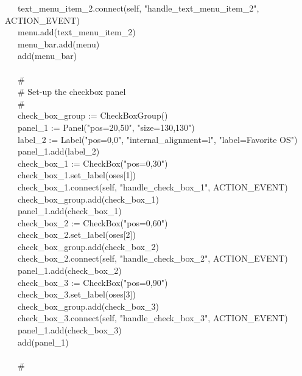 {\>   \ \ \ text\_menu\_item\_2.connect(self,
"handle\_text\_menu\_item\_2",\\
\>\>\>\>\>ACTION\_EVENT) \\
\>   \ \ \ menu.add(text\_menu\_item\_2) \\
\>   \ \ \ menu\_bar.add(menu) \\
\>   \ \ \ add(menu\_bar) \\
\ \\
\>   \ \ \ \# \\
\>   \ \ \ \# Set-up the checkbox panel \\
\>   \ \ \ \# \\
\>   \ \ \ check\_box\_group := CheckBoxGroup() \\
\>   \ \ \ panel\_1 := Panel("pos=20,50",
"size=130,130") \\
\>   \ \ \ label\_2 := Label("pos=0,0",
"internal\_alignment=l",
"label=Favorite OS") \\
\>   \ \ \ panel\_1.add(label\_2) \\
\>   \ \ \ check\_box\_1 :=
CheckBox("pos=0,30") \\
\>   \ \ \ check\_box\_1.set\_label(oses[1]) \\
\>   \ \ \ check\_box\_1.connect(self,
"handle\_check\_box\_1", ACTION\_EVENT) \\
\>   \ \ \ check\_box\_group.add(check\_box\_1) \\
\>   \ \ \ panel\_1.add(check\_box\_1) \\
\>   \ \ \ check\_box\_2 :=
CheckBox("pos=0,60") \\
\>   \ \ \ check\_box\_2.set\_label(oses[2]) \\
\>   \ \ \ check\_box\_group.add(check\_box\_2) \\
\>   \ \ \ check\_box\_2.connect(self,
"handle\_check\_box\_2", ACTION\_EVENT) \\
\>   \ \ \ panel\_1.add(check\_box\_2) \\
\>   \ \ \ check\_box\_3 :=
CheckBox("pos=0,90") \\
\>   \ \ \ check\_box\_3.set\_label(oses[3]) \\
\>   \ \ \ check\_box\_group.add(check\_box\_3) \\
\>   \ \ \ check\_box\_3.connect(self,
"handle\_check\_box\_3", ACTION\_EVENT) \\
\>   \ \ \ panel\_1.add(check\_box\_3) \\
\>   \ \ \ add(panel\_1) \\
\ \\
\>   \ \ \ \# \\
}
